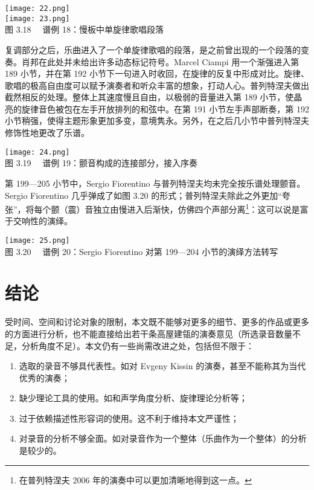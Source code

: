     \begin{center}
    \texttt{[image: 22.png]}\\
    \texttt{[image: 23.png]}\\
    \heiti \fontsize{10.5}{12.6}\selectfont 图 3.18 \ \ 谱例 18：慢板中单旋律歌唱段落
    \end{center}

    复调部分之后，乐曲进入了一个单旋律歌唱的段落，是之前曾出现的一个段落的变奏。肖邦在此处并未给出许多动态标记符号。Marcel Ciampi 用一个渐强进入第 189 小节，并在第 192 小节下一句进入时收回，在旋律的反复中形成对比。旋律、歌唱的极高自由度可以赋予演奏者和听众丰富的想象，打动人心。普列特涅夫做出截然相反的处理。整体上其速度慢且自由，以极弱的音量进入第 189 小节，使晶亮的旋律音色被包在左手开放排列的和弦中。在第 191 小节左手声部断奏，第 192 小节稍强，使得主题形象更加多变，意境隽永。另外，在之后几小节中普列特涅夫修饰性地更改了乐谱。

    \begin{center}
    \texttt{[image: 24.png]}\\
    \heiti \fontsize{10.5}{12.6}\selectfont 图 3.19 \ \ 谱例 19：颤音构成的连接部分，接入序奏
    \end{center}

    第 199—205 小节中，Sergio Fiorentino 与普列特涅夫均未完全按乐谱处理颤音。Sergio Fiorentino 几乎弹成了如图 3.20 的形式；普列特涅夫除此之外更加“夸张”，将每个颤（震）音独立由慢进入后渐快，仿佛四个声部分离\footnote{在普列特涅夫 2006 年的演奏中可以更加清晰地得到这一点。}：这可以说是富于交响性的演绎。

    \begin{center}
    \texttt{[image: 25.png]}\\
    \heiti \fontsize{10.5}{12.6}\selectfont 图 3.20 \ \ 谱例 20：Sergio Fiorentino 对第 199—204 小节的演绎方法转写
    \end{center}


    \section{\heiti \fontsize{16}{19.2}\selectfont 结论}
    受时间、空间和讨论对象的限制，本文既不能够对更多的细节、更多的作品或更多的方面进行分析，也不能直接给出若干条高屋建瓴的演奏意见（所选录音数量不足，分析角度不足）。本文仍有一些尚需改进之处，包括但不限于：
    \begin{enumerate}
        \item 选取的录音不够具代表性。如对 Evgeny Kissin 的演奏，甚至不能称其为当代优秀的演奏；
        \item 缺少理论工具的使用。如和声学角度分析、旋律理论分析等；
        \item 过于依赖描述性形容词的使用。这不利于维持本文严谨性；
        \item 对录音的分析不够全面。如对录音作为一个整体（乐曲作为一个整体）的分析是较少的。
    \end{enumerate}

